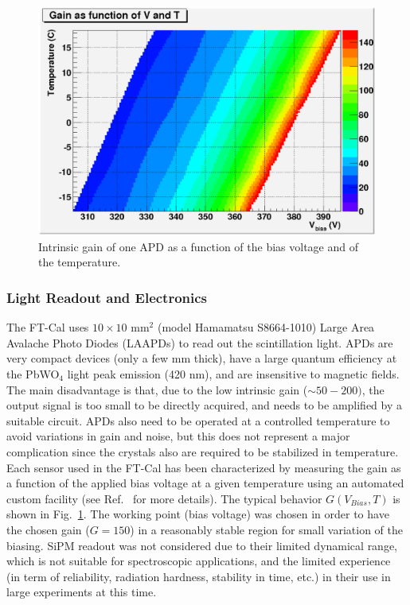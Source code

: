 \begin{figure}[th!]
\centering 
\includegraphics[width=1.0\columnwidth]{./fig/apd5.eps} 
\caption{Intrinsic gain of one APD as a function
of the bias voltage and of the temperature.}
\label{fig:G-V-T} 
\end{figure}

\subsubsection{Light Readout and Electronics }
The FT-Cal uses $10\times 10$ mm$^2$ (model Hamamatsu S8664-1010) Large Area Avalache Photo Diodes (LAAPDs) to read out the scintillation light. APDs are very compact devices (only a few mm thick),  have a large quantum efficiency at the PbWO$_4$ light peak emission (420 nm), and  are insensitive to magnetic fields. The main disadvantage is that, due to
the low intrinsic gain ($\sim 50-200)$, the output signal is too small to be directly acquired, and needs to be amplified
by a suitable circuit. APDs also need
to be operated at a controlled temperature to
avoid variations in gain and noise, but this does not represent a major complication since the crystals also are required to be stabilized in temperature.
Each sensor used in the FT-Cal has been characterized by measuring the gain as a function of the applied bias voltage at a given temperature using an automated  custom facility (see Ref.~\cite{celeAPD} for more details). The typical behavior $G(V_{Bias},T)$ is shown in Fig.~\ref{fig:G-V-T}. The working point (bias voltage) was chosen in order to have the chosen gain ($G=150$) in a reasonably stable region for small variation of the biasing. SiPM readout was not considered due to their limited dynamical range, which is not suitable for spectroscopic applications, and the limited experience (in term of reliability, radiation hardness, stability in time, etc.) in their use in large experiments at this time.\\

